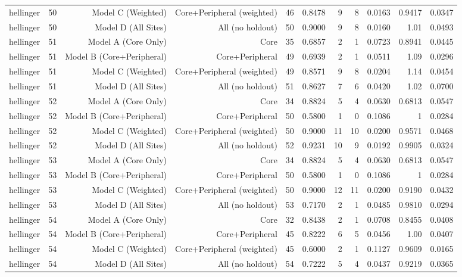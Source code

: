 {\begin{longtable}{lrrrrrrrrrr}
  hellinger & 50 & Model C (Weighted) & Core+Peripheral (weighted) & 46 & 0.8478 & 9 & 8 & 0.0163 & 0.9417 & 0.0347 \\
  hellinger & 50 & Model D (All Sites) & All (no holdout) & 50 & 0.9000 & 9 & 8 & 0.0160 & 1.01 & 0.0493 \\
  hellinger & 51 & Model A (Core Only) & Core & 35 & 0.6857 & 2 & 1 & 0.0723 & 0.8941 & 0.0445 \\
  hellinger & 51 & Model B (Core+Peripheral) & Core+Peripheral & 49 & 0.6939 & 2 & 1 & 0.0511 & 1.09 & 0.0296 \\
  hellinger & 51 & Model C (Weighted) & Core+Peripheral (weighted) & 49 & 0.8571 & 9 & 8 & 0.0204 & 1.14 & 0.0454 \\
  hellinger & 51 & Model D (All Sites) & All (no holdout) & 51 & 0.8627 & 7 & 6 & 0.0420 & 1.02 & 0.0700 \\
  hellinger & 52 & Model A (Core Only) & Core & 34 & 0.8824 & 5 & 4 & 0.0630 & 0.6813 & 0.0547 \\
  hellinger & 52 & Model B (Core+Peripheral) & Core+Peripheral & 50 & 0.5800 & 1 & 0 & 0.1086 & 1 & 0.0284 \\
  hellinger & 52 & Model C (Weighted) & Core+Peripheral (weighted) & 50 & 0.9000 & 11 & 10 & 0.0200 & 0.9571 & 0.0468 \\
  hellinger & 52 & Model D (All Sites) & All (no holdout) & 52 & 0.9231 & 10 & 9 & 0.0192 & 0.9905 & 0.0324 \\
  hellinger & 53 & Model A (Core Only) & Core & 34 & 0.8824 & 5 & 4 & 0.0630 & 0.6813 & 0.0547 \\
  hellinger & 53 & Model B (Core+Peripheral) & Core+Peripheral & 50 & 0.5800 & 1 & 0 & 0.1086 & 1 & 0.0284 \\
  hellinger & 53 & Model C (Weighted) & Core+Peripheral (weighted) & 50 & 0.9000 & 12 & 11 & 0.0200 & 0.9190 & 0.0432 \\
  hellinger & 53 & Model D (All Sites) & All (no holdout) & 53 & 0.7170 & 2 & 1 & 0.0485 & 0.9810 & 0.0294 \\
  hellinger & 54 & Model A (Core Only) & Core & 32 & 0.8438 & 2 & 1 & 0.0708 & 0.8455 & 0.0408 \\
  hellinger & 54 & Model B (Core+Peripheral) & Core+Peripheral & 45 & 0.8222 & 6 & 5 & 0.0456 & 1.00 & 0.0407 \\
  hellinger & 54 & Model C (Weighted) & Core+Peripheral (weighted) & 45 & 0.6000 & 2 & 1 & 0.1127 & 0.9609 & 0.0165 \\
  hellinger & 54 & Model D (All Sites) & All (no holdout) & 54 & 0.7222 & 5 & 4 & 0.0437 & 0.9219 & 0.0365 \\

\end{longtable}}
